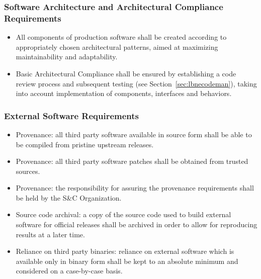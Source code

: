 \subsubsection{Software Architecture and Architectural Compliance Requirements}

\begin{itemize}

\item All components of production software shall be created according to appropriately chosen architectural patterns, aimed at maximizing maintainability and adaptability.

\item Basic Architectural Compliance shall be ensured by establishing a code review process and subsequent testing (see Section~\ref{sec:lbnecodeman}), taking into account implementation of components, interfaces and behaviors.

\end{itemize}

\subsubsection{External Software Requirements}
\begin{itemize}
\item Provenance: all third party software available in source form shall be able to be compiled from pristine upstream releases.

\item Provenance: all third party software patches shall be obtained from trusted sources.

\item Provenance: the responsibility for assuring the provenance requirements shall be held by the S\&C Organization.

\item Source code archival: a copy of the source code used to build external software for official releases shall be archived in order to allow for reproducing results at a later time.

\item Reliance on third party binaries: reliance on external software which is available only in binary form shall be kept to an absolute minimum and considered on a case-by-case basis.


\end{itemize}


